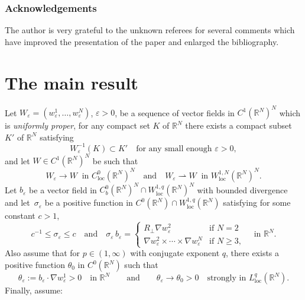 \documentclass[JEP,XML,SOM,Unicode]{cedram}
\newcommand{\loc}{\mathrm{loc}}
\def \RR {\mathbb R}
\theoremstyle{plain}
\theoremstyle{definition}
\begin{document}
\subsubsection*{Acknowledgements} The author is very grateful to the unknown referees for several comments which have improved the presentation of the paper and enlarged the bibliography.

\section{The main result}\label{s.res}
Let $W_\varepsilon=(w_\varepsilon^1,\dots,w_\varepsilon^N)$, $\varepsilon>0$, be a sequence of vector fields in $C^1(\RR^N)^N$
which is {\em uniformly proper}, \ie for any compact set $K$ of $\RR^N$ there exists a compact subset $K'$ of $\RR^N$ satisfying\enlargethispage{-\baselineskip}%
\begin{equation}\label{upWe}
W_\varepsilon^{-1}(K)\subset K'\quad\mbox{for any small enough }\varepsilon>0,
\end{equation}
and let $W\in C^1(\RR^N)^N$ be such that
\begin{equation}\label{cWe}
W_\varepsilon\to W\;\;\mbox{in }C^0_\loc(\RR^N)^N\quad\mbox{and}\quad W_\varepsilon\rightharpoonup W\;\;\mbox{in }W^{1,N}_\loc(\RR^N)^N.
\end{equation}
Let $b_\varepsilon$ be a vector field in $C^0_b(\RR^N)^N\cap W^{1,q}_\loc(\RR^N)^N$ with bounded divergence and let~$\sigma_\varepsilon$ be a positive function in $C^0(\RR^N)\cap W^{1,q}_\loc(\RR^N)$ satisfying for some constant $c>1$,
\begin{equation}\label{siebe}
c^{-1}\leq\sigma_\varepsilon\leq c\quad\mbox{and}\quad
\sigma_\varepsilon\,b_\varepsilon=\begin{cases}
R_\perp\nabla w_\varepsilon^2 & \mbox{if }N=2
\\[3pt]
\nabla w_\varepsilon^2\times\cdots\times \nabla w_\varepsilon^N & \mbox{if }N\geq 3,
\end{cases}
\quad \mbox{in }\RR^N.
\end{equation}
Also assume that for $p\in(1,\infty)$ with conjugate exponent $q$, there exists a positive function $\theta_0$ in $C^0(\RR^N)$ such that
\begin{equation}\label{cthe}
\theta_\varepsilon:=b_\varepsilon\cdot\nabla w_\varepsilon^1>0\quad\mbox{in }\RR^N \qquad\mbox{and}\qquad \theta_\varepsilon\to\theta_0>0\quad\mbox{strongly in }L^q_\loc(\RR^N).
\end{equation}
\pagebreak[2]%
Finally, assume:
\end{document}
